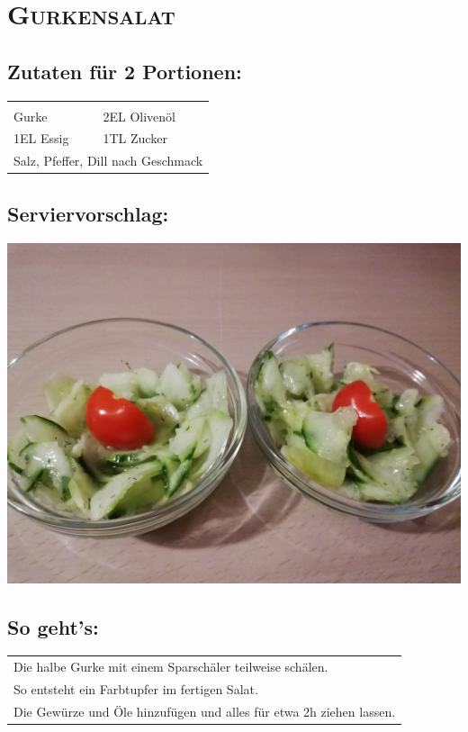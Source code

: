 \section{\textsc{Gurkensalat}}

\subsection*{Zutaten für 2 Portionen:}

\begin{tabular}{p{7.5cm} p{7.5cm}}
	& \\
	\sfrac{1}{2} Gurke & 2EL Olivenöl \\
	1EL Essig & 1TL Zucker \\
	\multicolumn{2}{l}{Salz, Pfeffer, Dill nach Geschmack}
\end{tabular}

\subsection*{Serviervorschlag:}

\includegraphics[width=\textwidth]{img/gurkensalat/gurkensalat_fertig.jpg}

\subsection*{So geht's:}

\begin{tabular}{p{15cm}}
	\\
	Die halbe Gurke mit einem Sparschäler teilweise schälen.\\
	So entsteht ein Farbtupfer im fertigen Salat.\\
	Die Gewürze und Öle hinzufügen und alles für etwa 2h ziehen lassen.
\end{tabular}